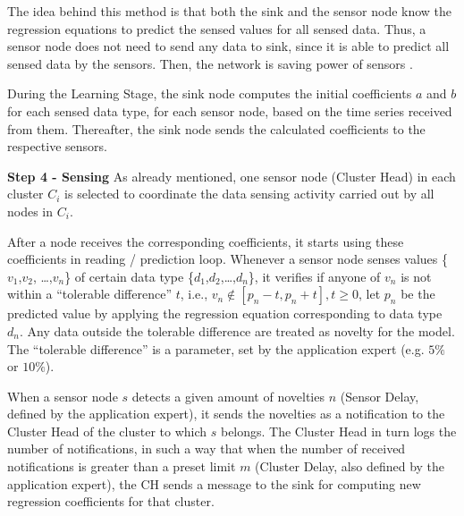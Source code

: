 \documentclass{acm_proc_article-sp}
\begin{document}
The idea behind this method is that both the sink and the sensor node know the
regression equations to predict the sensed values for all sensed data. Thus, a
sensor node does not need to send any data to sink, since it is able to predict
all sensed data by the sensors. Then, the network is saving power of sensors
\cite{MaiaACR2013}.
\vspace*{-.3cm}

During the Learning Stage, the sink node computes the initial coefficients $a$
and $b$ for each sensed data type, for each sensor node, based on the time
series received from them. Thereafter, the sink node sends the calculated
coefficients to the respective sensors.
\vspace*{-.3cm}

{\bf Step 4 - Sensing}
As already mentioned, one sensor node (Cluster Head) in each cluster $C_{i}$ is
selected to coordinate the data sensing activity carried out by all nodes in
$C_{i}$.
\vspace*{-.3cm}

After a node receives the corresponding coefficients, it starts using these
coefficients in reading / prediction loop.
Whenever a sensor node senses values \{$v_{1}$,$v_{2}$, \ldots,$v_{n}$\} of
certain data type \{$d_{1}$,$d_{2}$,\ldots,$d_{n}$\}, it verifies if anyone of
$v_{n}$ is not within a ``tolerable difference'' $t$, i.e., $v_{n} \not \in
[p_{n}-t,p_{n}+t], t \geq 0$, let $p_{n}$ be the predicted value by applying
the regression equation corresponding to data type $d_{n}$. Any data outside the
tolerable difference are treated as novelty for the model.
The ``tolerable difference'' is a parameter, set by the application expert (e.g.
$5\%$ or $10\%$).
\vspace*{-.3cm}

When a sensor node $s$ detects a given amount of novelties $n$ (Sensor Delay,
defined by the application expert), it sends the novelties as a notification to
the Cluster Head of the cluster to which $s$ belongs. The Cluster Head in turn
logs the number of notifications, in such a way that when the number of received
notifications is greater than a preset limit $m$ (Cluster Delay, also
defined by the application expert), the CH sends a message to the sink for
computing new regression coefficients for that cluster.
\vspace*{-.3cm}
\end{document}
